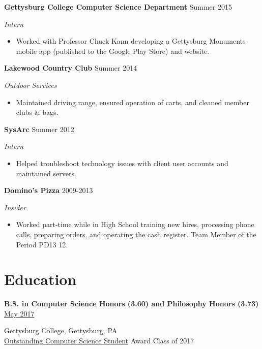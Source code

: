 \documentclass[11pt]{article}
\begin{document}
\textbf{Gettysburg College Computer Science Department}
\hfill
Summer 2015

\textit{Intern}

\begin{itemize}
\item[] Worked with Professor Chuck Kann developing a Gettysburg Monuments mobile app (published to the Google Play Store) and website.\\
\end{itemize}

\textbf{Lakewood Country Club}
\hfill
Summer 2014

\textit{Outdoor Services}

\begin{itemize}
\item[] Maintained driving range, ensured operation of carts, and cleaned member clubs \& bags.\\
\end{itemize}

\textbf{SysArc}
\hfill
Summer 2012

\textit{Intern}

\begin{itemize}
\item[]  Helped troubleshoot technology issues with client user accounts and maintained servers.\\
\end{itemize}

\textbf{Domino's Pizza}
\hfill
2009-2013

\textit{Insider}

\begin{itemize}
\item[]  Worked part-time while in High School training new hires, processing phone calls, preparing orders, and operating the cash register. Team Member of the Period PD13 12.
\end{itemize}

\section*{Education}
\textbf{B.S. in Computer Science {\footnotesize Honors (3.60)} and Philosophy {\footnotesize Honors (3.73)}}
\hfill
\href{https://www.gettysburg.edu/commencement/2017/pdfs/2017\%20Commencement\%20Program\%20FINAL.pdf}{May 2017}


Gettysburg College, Gettysburg, PA\\

\href{http://www.gettysburg.edu/academics/cs/programs/honors.dot}{Outstanding Computer Science Student} Award \hfill Class of 2017
\end{document}
